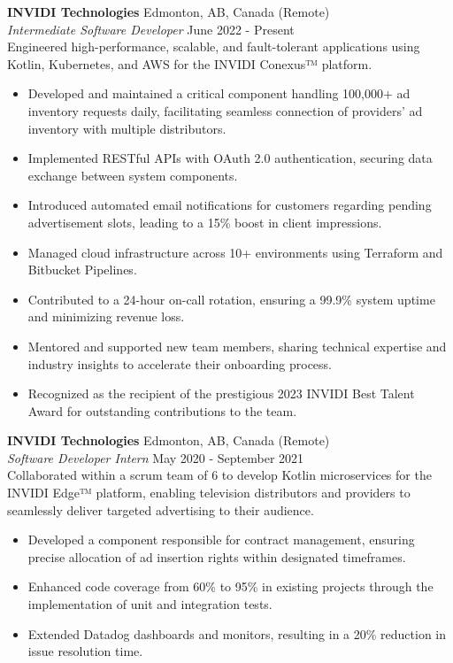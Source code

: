 \documentclass[a4paper]{article}
\begin{document}
\textbf{INVIDI Technologies} \hfill Edmonton, AB, Canada (Remote)\\
\textit{Intermediate Software Developer} \hfill June 2022 - Present \\
Engineered high-performance, scalable, and fault-tolerant applications using Kotlin, Kubernetes, and AWS for the INVIDI Conexus™ platform.
\vspace{-1mm}
\begin{itemize} \itemsep 1pt
    \item Developed and maintained a critical component handling 100,000+ ad inventory requests daily, facilitating seamless connection of providers' ad inventory with multiple distributors.
    \item Implemented RESTful APIs with OAuth 2.0 authentication, securing data exchange between system components.
	\item Introduced automated email notifications for customers regarding pending advertisement slots, leading to a 15\% boost in client impressions.
    \item Managed cloud infrastructure across 10+ environments using Terraform and Bitbucket Pipelines.
    \item Contributed to a 24-hour on-call rotation, ensuring a 99.9\% system uptime and minimizing revenue loss.
    \item Mentored and supported new team members, sharing technical expertise and industry insights to accelerate their onboarding process.
    \item Recognized as the recipient of the prestigious 2023 INVIDI Best Talent Award for outstanding contributions to the team.
\end{itemize}
\vspace{1mm}

\textbf{INVIDI Technologies} \hfill Edmonton, AB, Canada (Remote)\\
\textit{Software Developer Intern} \hfill May 2020 - September 2021\\
Collaborated within a scrum team of 6 to develop Kotlin microservices for the INVIDI Edge™ platform, enabling television distributors and providers to seamlessly deliver targeted advertising to their audience.
\vspace{-1mm}
\begin{itemize} \itemsep 1pt
    \item Developed a component responsible for contract management, ensuring precise allocation of ad insertion rights within designated timeframes.
	\item Enhanced code coverage from 60\% to 95\% in existing projects through the implementation of unit and integration tests.
	\item Extended Datadog dashboards and monitors, resulting in a 20\% reduction in issue resolution time.
\end{itemize}
\end{document}
